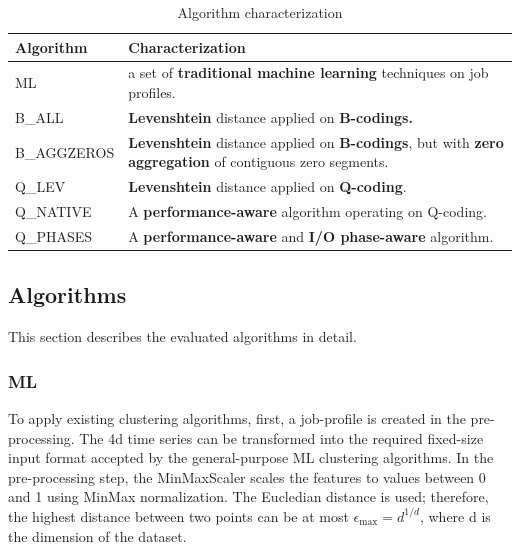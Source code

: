 \documentclass{jhps}
\begin{document}
\begin{table}[ht]
  \begin{tabularx}{\textwidth}{lX}
    Algorithm & Characterization \\
    \midrule
    ML            & a set of \textbf{traditional machine learning} techniques on job profiles.                                                        \\
    B\_ALL      & \textbf{Levenshtein} distance applied on \textbf{B-codings.}                                                                 \\
    B\_AGGZEROS & \textbf{Levenshtein} distance applied on \textbf{B-codings}, but with \textbf{zero aggregation} of contiguous zero segments. \\
    Q\_LEV      & \textbf{Levenshtein} distance applied on \textbf{Q-coding}.                                                             \\
    Q\_NATIVE   & A \textbf{performance-aware} algorithm operating on Q-coding.                                                                                           \\
    Q\_PHASES     & A \textbf{performance-aware} and \textbf{I/O phase-aware} algorithm.                                                              \\
  \end{tabularx}
  \caption{Algorithm characterization}
  \label{tab:alg_character}
\end{table}


\subsection{Algorithms}
This section describes the evaluated algorithms in detail.

\subsubsection{ML}

To apply existing clustering algorithms, first, a job-profile is created in the pre-processing.
The 4d time series can be transformed into the required fixed-size input format accepted by the general-purpose ML clustering algorithms.
In the pre-processing step, the MinMaxScaler scales the features to values between 0 and 1 using MinMax normalization.
The Eucledian distance is used; therefore, the highest distance between two points can be at most \(\epsilon_\text{max} = d^{1/d}\), where d is the dimension of the dataset.
\end{document}
